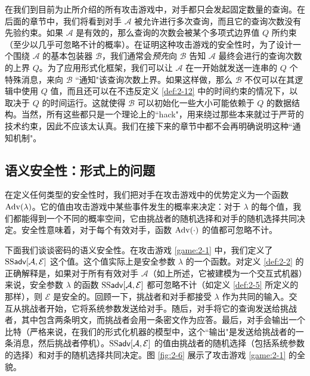 \begin{snote}[查询有界对手。]
在我们到目前为止所介绍的所有攻击游戏中，对手都只会发起固定数量的查询。在后面的章节中，我们将看到对手 $\mathcal{A}$ 被允许进行多次查询，而且它的查询次数没有先验约束。如果 $\mathcal{A}$ 是有效的，那么查询的次数会被某个多项式边界值 $Q$ 所约束（至少以几乎可忽略不计的概率）。在证明这种攻击游戏的安全性时，为了设计一个围绕 $\mathcal{A}$ 的基本包装器 $\mathcal{B}$，我们通常会\emph{预先}向 $\mathcal{B}$ 告知 $\mathcal{A}$ 最终会进行的查询次数的上界 $Q$。为了应用形式化框架，我们可以让 $\mathcal{A}$ 在一开始就发送一连串的 $Q$ 个特殊消息，来向 $\mathcal{B}$ ``通知"该查询次数上界。如果这样做，那么 $\mathcal{B}$ 不仅可以在其逻辑中使用 $Q$ 值，而且还可以在不违反定义 \ref{def:2-12} 中的时间约束的情况下，以取决于 $Q$ 的时间运行。这就使得 $\mathcal{B}$ 可以初始化一些大小可能依赖于 $Q$ 的数据结构。当然，所有这些都只是一个理论上的``hack"，用来绕过那些本来就过于严苛的技术约束，因此不应该太认真。我们在接下来的章节中都不会再明确说明这种``通知机制"。
\end{snote}


\subsection{语义安全性：形式上的问题}

在定义任何类型的安全性时，我们把对手在攻击游戏中的优势定义为一个函数 ${\rm Adv}(\lambda)$。它的值由攻击游戏中某些事件发生的概率来决定：对于 $\lambda$ 的每个值，我们都能得到一个不同的概率空间，它由挑战者的随机选择和对手的随机选择共同决定。安全性意味着，对于每个有效对手，函数 ${\rm Adv}(\cdot)$ 的值都可忽略不计。

下面我们谈谈密码的语义安全性。在攻击游戏 \ref{game:2-1} 中，我们定义了 ${\rm SS\mathsf{adv}}[\mathcal{A},\mathcal{E}]$ 这个值。这个值实际上是安全参数 $\lambda$ 的一个函数。对定义 \ref{def:2-2} 的正确解释是，如果对于所有有效对手 $\mathcal{A}$（如上所述，它被建模为一个交互式机器）来说，安全参数 $\lambda$ 的函数 ${\rm SS\mathsf{adv}}[\mathcal{A},\mathcal{E}]$ 都可忽略不计（如定义 \ref{def:2-5} 所定义的那样），则 $\mathcal{E}$ 是安全的。回顾一下，挑战者和对手都接受 $\lambda$ 作为共同的输入。交互从挑战者开始，它将系统参数发送给对手。随后，对手将它的查询发送给挑战者，其中包含两条明文，而挑战者会用一条密文作为应答。最后，对手会输出一个比特（严格来说，在我们的形式化机器的模型中，这个``输出"是发送给挑战者的一条消息，然后挑战者停机）。${\rm SS\mathsf{adv}}[\mathcal{A},\mathcal{E}]$ 的值由挑战者的随机选择（包括系统参数的选择）和对手的随机选择共同决定。图 \ref{fig:2-6} 展示了攻击游戏 \ref{game:2-1} 的全貌。

